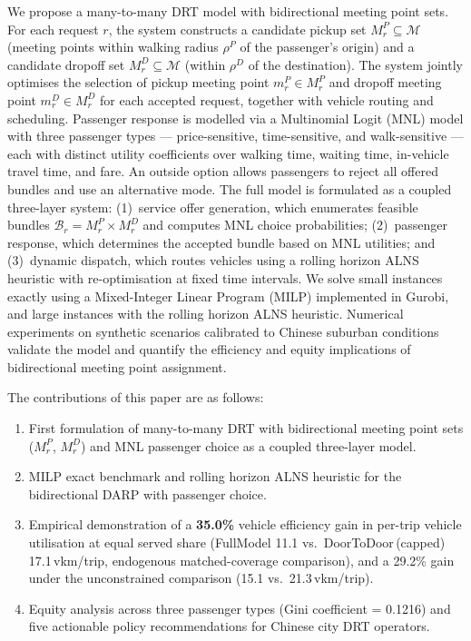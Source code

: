 We propose a many-to-many DRT model with bidirectional meeting point sets.
For each request $r$, the system constructs a candidate pickup set
$M_r^P \subseteq \mathcal{M}$ (meeting points within walking radius $\rho^P$ of the
passenger's origin) and a candidate dropoff set
$M_r^D \subseteq \mathcal{M}$ (within $\rho^D$ of the destination).
The system jointly optimises the selection of pickup meeting point $m_r^P \in M_r^P$
and dropoff meeting point $m_r^D \in M_r^D$ for each accepted request, together with
vehicle routing and scheduling.
Passenger response is modelled via a Multinomial Logit (MNL) model with three
passenger types — price-sensitive, time-sensitive, and walk-sensitive — each with
distinct utility coefficients over walking time, waiting time, in-vehicle travel time,
and fare.
An outside option allows passengers to reject all offered bundles and use an
alternative mode.
The full model is formulated as a coupled three-layer system:
(1)~service offer generation, which enumerates feasible bundles
$\mathcal{B}_r = M_r^P \times M_r^D$ and computes MNL choice probabilities;
(2)~passenger response, which determines the accepted bundle based on MNL utilities;
and (3)~dynamic dispatch, which routes vehicles using a rolling horizon ALNS
heuristic with re-optimisation at fixed time intervals.
We solve small instances exactly using a Mixed-Integer Linear Program (MILP)
implemented in Gurobi, and large instances with the rolling horizon ALNS heuristic.
Numerical experiments on synthetic scenarios calibrated to Chinese suburban conditions
validate the model and quantify the efficiency and equity implications of bidirectional
meeting point assignment.

The contributions of this paper are as follows:

\begin{enumerate}
  \item First formulation of many-to-many DRT with bidirectional meeting point sets
        ($M_r^P$, $M_r^D$) and MNL passenger choice as a coupled three-layer model.
  \item MILP exact benchmark and rolling horizon ALNS heuristic for the bidirectional
        DARP with passenger choice.
  \item Empirical demonstration of a \textbf{35.0\%} vehicle efficiency gain in
        per-trip vehicle utilisation at equal served share (FullModel 11.1 vs.\
        DoorToDoor\,(capped) 17.1\,vkm/trip, endogenous matched-coverage comparison),
        and a 29.2\% gain under the unconstrained comparison (15.1 vs.\ 21.3\,vkm/trip).
  \item Equity analysis across three passenger types (Gini coefficient = 0.1216) and
        five actionable policy recommendations for Chinese city DRT operators.
\end{enumerate}


